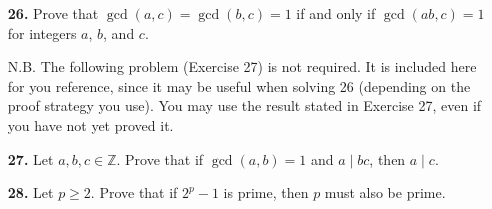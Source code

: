 \documentclass[12pt,reqno]{amsart}
\begin{document}
\begin{enumerate}
\bigskip

\item[{\bf 26.}]
Prove that $\gcd(a,c) = \gcd(b,c) =1$ if and only if $\gcd(ab,c) = 1$ for integers $a$, $b$, and $c$.

N.B. The following problem (Exercise 27) is not required. It is included here for you reference, since it may be useful when solving 26 (depending on the proof strategy you use). You may use the result stated in Exercise 27, even if you have not yet proved it.


\bigskip

\item[{\bf 27.}]
Let $a, b, c \in {\mathbb Z}$.  Prove that if $\gcd(a,b) = 1$ and $a  \mid bc$, then $a  \mid  c$. 

 

\bigskip

\item[{\bf 28.}]
Let $p \geq 2$.  Prove that if $2^p-1$ is prime, then $p$ must also be prime.

\end{enumerate}
\end{document}

